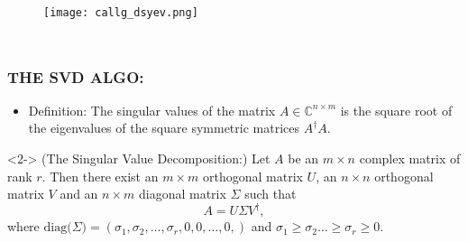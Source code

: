 \documentclass[a4paper,8pt]{beamer} %
\newcommand{\diag}[1]{\text{diag}{#1}}
\begin{document}
\begin{frame}
\begin{columns}[l]
%
\column{2.8cm}
%
\begin{figure}%
\begin{center}
\texttt{[image: callg\_dsyev.png]} 
\end{center}
\end{figure}
%
\end{columns}
\end{frame}%
\begin{frame} %
\frametitle{THE SVD ALGO:}
\begin{itemize}
	\item <1-> Definition: 
				The singular values of the matrix $A\in\mathbb C^{n\times m}$ is the 
				square root of the eigenvalues of the square symmetric matrices $A^\dagger A$.%
\end{itemize}
		\begin{theorem} 
			(The Singular Value Decomposition:)
			Let $A$ be an $m\times n$ complex matrix of rank $r$. Then there exist an $m\times m$
			orthogonal matrix $U$, an $n\times n$ orthogonal matrix $V$ and an $n\times m$ diagonal 
			matrix $\Sigma$ such that 
			\begin{equation}
				A = U \Sigma V^\dagger,
			\end{equation}
			where $\diag (\Sigma) = (\sigma_1,\sigma_2,\dots,\sigma_r, 0,0,\dots,0,)$ and 
			$\sigma_1\ge\sigma_2\dots\ge\sigma_r\ge0$.
		\end{theorem}
\end{frame}%
\end{document}
